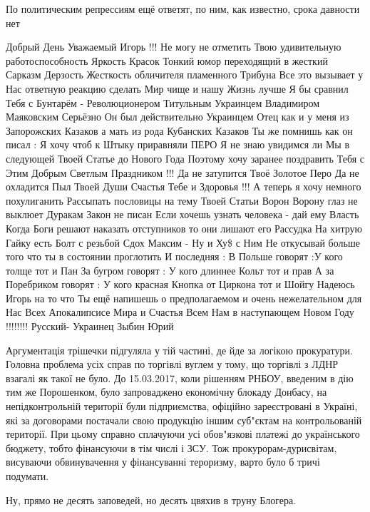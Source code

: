 \begin{itemize}
По политическим репрессиям ещё ответят, по ним, как известно, срока давности нет


Добрый День Уважаемый Игорь !!! Не могу не отметить Твою удивительную
работоспособность Яркость Красок Тонкий юмор переходящий в жесткий Сарказм
Дерзость Жесткость обличителя пламенного Трибуна Все это вызывает у Нас
ответную реакцию сделать Мир чище и нашу Жизнь лучше Я бы сравнил Тебя с
Бунтарём - Революционером Титульным Украинцем Владимиром Маяковским Серьёзно Он
был действительно Украинцем Отец как и у меня из Запорожских Казаков а мать из
рода Кубанских Казаков Ты же помнишь как он писал : Я хочу чтоб к Штыку
приравняли ПЕРО Я не знаю увидимся ли Мы в следующей Твоей Статье до Нового
Года Поэтому хочу заранее поздравить Тебя с Этим Добрым Светлым Праздником !!!
Да не затупится Твоё Золотое Перо Да не охладится Пыл Твоей Души Счастья Тебе и
Здоровья !!! А теперь я хочу немного похулиганить Рассыпать пословицы на тему
Твоей Статьи Ворон Ворону глаз не выклюет Дуракам Закон не писан Если хочешь
узнать человека - дай ему Власть Когда Боги решают наказать отступников то они
лишают его Рассудка На хитрую Гайку есть Болт с резьбой Сдох Максим - Ну и Ху\$
с Ним Не откусывай больше того что ты в состоянии проглотить И последняя : В
Польше говорят :У кого толще тот и Пан За бугром говорят : У кого длиннее Кольт
тот и прав А за Поребриком говорят : У кого красная Кнопка от Циркона тот и
Шойгу Надеюсь Игорь на то что Ты ещё напишешь о предполагаемом и очень
нежелательном для Нас Всех Апокалипсисе Мира и Счастья Всем Нам в наступающем
Новом Году !!!!!!!! Русский- Украинец Зыбин Юрий



Аргументація трішечки підгуляла у тій частині, де йде за логікою прокуратури.
Головна проблема усіх справ по торгівлі вуглем у тому, що торгівлі з ЛДНР
взагалі як такої не було. До 15.03.2017, коли рішенням РНБОУ, введеним в дію
тим же Порошенком, було запроваджено економічну блокаду Донбасу, на
непідконтрольній території були підприємства, офіційно зареєстровані в Україні,
які за договорами постачали свою продукцію іншим суб"єктам на контрольованій
території. При цьому справно сплачуючи усі обов"язкові платежі до українського
бюджету, тобто фінансуючи в тім числі і ЗСУ. Тож прокурорам-дурисвітам,
висуваючи обвинувачення у фінансуванні тероризму, варто було б тричі подумати.

Ну, прямо не десять заповедей, но десять цвяхив в труну Блогера.


\end{itemize}

